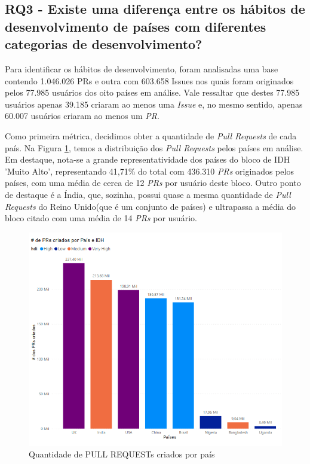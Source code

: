 \documentclass[12pt]{article}
\begin{document}
\subsection{RQ3 - Existe uma diferença entre os hábitos de desenvolvimento de países com diferentes categorias de desenvolvimento?}

Para identificar os hábitos de desenvolvimento, foram analisadas uma base contendo 1.046.026 PRs e outra com 603.658 Issues nos quais foram originados pelos 77.985 usuários dos oito países em análise. Vale ressaltar que destes 77.985 usuários apenas 39.185 criaram ao menos uma \textit{Issue} e, no mesmo sentido, apenas 60.007 usuários criaram ao menos um \textit{PR}.

Como primeira métrica, decidimos obter a quantidade de \textit{Pull Requests} de cada país. Na Figura \ref{fig:qttprs}, temos a distribuição dos \textit{Pull Requests} pelos países em análise. Em destaque, nota-se a grande representatividade dos países do bloco de IDH 'Muito Alto', representando 41,71\% do total com 436.310 \textit{PRs} originados pelos países, com uma média de cerca de 12 \textit{PRs} por usuário deste bloco. Outro ponto de destaque é a Índia, que, sozinha, possui quase a mesma quantidade de \textit{Pull Requests} do Reino Unido(que é um conjunto de países) e ultrapassa a média do bloco citado com uma média de 14 \textit{PRs} por usuário.

\begin{figure}[!htb]
\centering
\includegraphics[width=1\textwidth]{img/rq3/number of prs.png}
\caption{Quantidade de PULL REQUESTs criados por país}
\label{fig:qttprs}
\end{figure}
\end{document}
